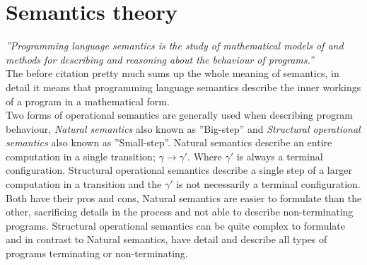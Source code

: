 \section{Semantics theory}\label{sec:semantic}
\emph{''Programming language semantics is the study of mathematical models of and methods for describing and reasoning about the behaviour of programs.''}\cite{transtrees}\\
The before citation pretty much sums up the whole meaning of semantics, in detail it means that programming language semantics describe the inner workings of a program in a mathematical form.\\
Two forms of operational semantics are generally used when describing program behaviour, \emph{Natural semantics} also known as ''Big-step'' and \emph{Structural operational semantics} also known as ''Small-step''.
Natural semantics describe an entire computation in a single transition;
$ \gamma \rightarrow \gamma' $.
Where $\gamma'$ is always a terminal configuration.
Structural operational semantics describe a single step of a larger computation in a transition and the $ \gamma' $ is not necessarily a terminal configuration.\\
Both have their pros and cons, Natural semantics are easier to formulate than the other, sacrificing details in the process and not able to describe non-terminating programs. Structural operational semantics can be quite complex to formulate and in contrast to Natural semantics, have detail and describe all types of programs terminating or non-terminating.\cite{opsemantics}\cite{transtrees}